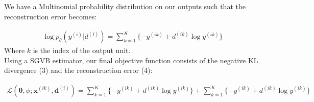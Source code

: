 \documentclass{article}
\begin{document}
We have a Multinomial probability distribution on our outputs such that the reconstruction error becomes:

\begin{align}
\log p_{\theta}(y^{(i)}|d^{(i)}) = \sum_{k=1}^K\{-y^{(ik)} + d^{(ik)} \log{y^{(ik)}}\}
\end{align}
Where $k$ is the index of the output unit.\\


Using a SGVB estimator, our final objective function consists of the negative KL divergence (3) and the reconstruction error (4):

\begin{align}
\mathcal{L}(\mathbf{\theta}, \phi; \mathbf{x}^{(ik)},
 \mathbf{d}^{(i)}) = \sum_{k=1}^K\{-y^{(ik)} + d^{(ik)} \log{y^{(ik)}}\} + \sum_{k=1}^K\{-y^{(ik)} + d^{(ik)} \log{y^{(ik)}}\}
\end{align}
\end{document}
